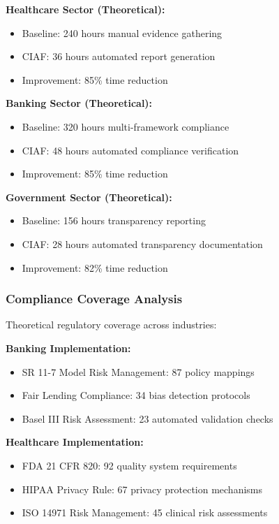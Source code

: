 \documentclass[12pt,a4paper]{article}
\begin{document}
\textbf{Healthcare Sector (Theoretical):}
\begin{itemize}
\item Baseline: 240 hours manual evidence gathering
\item CIAF: 36 hours automated report generation
\item Improvement: 85\% time reduction
\end{itemize}

\textbf{Banking Sector (Theoretical):}
\begin{itemize}
\item Baseline: 320 hours multi-framework compliance
\item CIAF: 48 hours automated compliance verification
\item Improvement: 85\% time reduction
\end{itemize}

\textbf{Government Sector (Theoretical):}
\begin{itemize}
\item Baseline: 156 hours transparency reporting
\item CIAF: 28 hours automated transparency documentation
\item Improvement: 82\% time reduction
\end{itemize}

\subsubsection{Compliance Coverage Analysis}

Theoretical regulatory coverage across industries:

\textbf{Banking Implementation:}
\begin{itemize}
\item SR 11-7 Model Risk Management: 87 policy mappings
\item Fair Lending Compliance: 34 bias detection protocols
\item Basel III Risk Assessment: 23 automated validation checks
\end{itemize}

\textbf{Healthcare Implementation:}
\begin{itemize}
\item FDA 21 CFR 820: 92 quality system requirements
\item HIPAA Privacy Rule: 67 privacy protection mechanisms
\item ISO 14971 Risk Management: 45 clinical risk assessments
\end{itemize}
\end{document}
